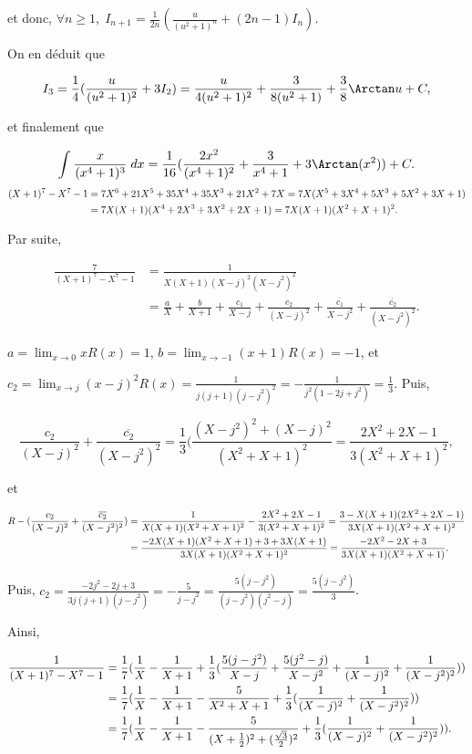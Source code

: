 {{et donc, $\forall n\geq1,\;I_{n+1}=\frac{1}{2n}(\frac{u}{(u^2+1)^n}+(2n-1)I_n)$.

On en déduit que

$$I_3=\frac{1}{4}(\frac{u}{(u^2+1)^2}+3I_2)=\frac{u}{4(u^2+1)^2}+\frac{3}{8(u^2+1)}+\frac{3}{8}\Arctan u+C,$$

et finalement que

$$\int_{}^{}\frac{x}{(x^4+1)^3}\;dx=\frac{1}{16}(\frac{2x^2}{(x^4+1)^2}+\frac{3}{x^4+1}+3\Arctan(x^2))+C.$$
\begin{align*}\ensuremath
(X+1)^7-X^7-1&=7X^6+21X^5+35X^4+35X^3+21X^2+7X=7X(X^5+3X^4+5X^3+5X^2+3X+1)\\
 &=7X(X+1)(X^4+2X^3+3X^2+2X+1)=7X(X+1)(X^2+X+1)^2.
\end{align*}

Par suite,

\begin{align*}
\frac{7}{(X+1)^7-X^7-1} &= \frac{1}{X(X+1)(X-j)^2(X-j^2)^2} \\
&= \frac{a}{X}+\frac{b}{X+1}+\frac{c_1}{X-j} +\frac{c_2}{(X-j)^2}+\frac{\overline{c_1}}{X-j^2}+\frac{\overline{c_2}}{(X-j^2)^2}.
\end{align*}

$a=\lim_{x\rightarrow 0}xR(x)=1$, $b=\lim_{x\rightarrow -1}(x+1)R(x)=-1$, et

$c_2=\lim_{x\rightarrow j}(x-j)^2R(x)=\frac{1}{j(j+1)(j-j^2)^2}=-\frac{1}{j^2(1-2j+j^2)}=\frac{1}{3}$. Puis, 

$$\frac{c_2}{(X-j)^2}+\frac{\overline{c_2}}{(X-j^2)^2}=\frac{1}{3}(\frac{(X-j^2)^2+(X-j)^2}{(X^2+X+1)^2}
=\frac{2X^2+2X-1}{3(X^2+X+1)^2},$$

et

\begin{align*}\ensuremath
R-(\frac{c_2}{(X-j)^2}+\frac{\overline{c_2}}{(X-j^2)^2})
&=\frac{1}{X(X+1)(X^2+X+1)^2}-\frac{2X^2+2X-1}{3(X^2+X+1)^2}
=\frac{3-X(X+1)(2X^2+2X-1)}{3X(X+1)(X^2+X+1)^2}\\
 &=\frac{-2X(X+1)(X^2+X+1)+3+3X(X+1)}{3X(X+1)(X^2+X+1)^2}
=\frac{-2X^2-2X+3}{3X(X+1)(X^2+X+1)}.
\end{align*}

Puis, $c_2=\frac{-2j^2-2j+3}{3j(j+1)(j-j^2)}=-\frac{5}{j-j^2}=\frac{5(j-j^2)}{(j-j^2)(j^2-j)}=\frac{5(j-j^2)}{3}$.

Ainsi,

\begin{align*}\ensuremath
\frac{1}{(X+1)^7-X^7-1}&=\frac{1}{7}
(\frac{1}{X}-\frac{1}{X+1}+\frac{1}{3}(\frac{5(j-j^2)}{X-j}+\frac{5(j^2-j)}{X-j^2}+\frac{1}{(X-j)^2}+\frac{1}{(X-j^2)^2}))\\
 &=\frac{1}{7}
(\frac{1}{X}-\frac{1}{X+1}-\frac{5}{X^2+X+1}+\frac{1}{3}(\frac{1}{(X-j)^2}+\frac{1}{(X-j^2)^2}))\\
 &=\frac{1}{7}
(\frac{1}{X}-\frac{1}{X+1}-\frac{5}{(X+\frac{1}{2})^2+(\frac{\sqrt{3}}{2})^2}+\frac{1}{3}(\frac{1}{(X-j)^2}+\frac{1}{(X-j^2)^2})).
\end{align*}

}}
